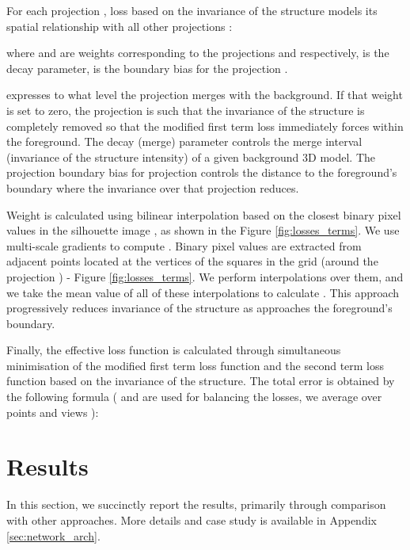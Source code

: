\documentclass[runningheads]{llncs}
\begin{document}
For each projection , loss based on the invariance of the structure models its spatial relationship with all other projections :

where  and  are weights corresponding to the projections  and  respectively,  is the decay parameter,  is the boundary bias for the projection .

 expresses to what level the projection  merges with the background. If that weight is set to zero, the projection  is such that the invariance of the structure is completely removed so that the modified first term loss  immediately forces  within the foreground. The decay (merge) parameter controls the merge interval (invariance of the structure intensity) of a given background 3D model. The projection boundary bias  for projection  controls the distance to the foreground's boundary where the invariance over that projection reduces.

Weight  is calculated using bilinear interpolation based on the closest binary pixel values in the silhouette image , as shown in the Figure \ref{fig:losses_terms}. We use multi-scale gradients \cite{SREEGADHA2016713} to compute . Binary pixel values are extracted from adjacent points located at the vertices of the squares in the grid (around the projection ) - Figure \ref{fig:losses_terms}. We perform interpolations over them, and we take the mean value of all of these interpolations to calculate . This approach progressively reduces invariance of the structure as  approaches the foreground's boundary.

Finally, the effective loss function  is calculated through simultaneous minimisation of the modified first term loss function  and the second term loss function  based on the invariance of the structure. The total error  is obtained by the following formula ( and  are used for balancing the losses, we average over points  and views ):




\section{Results}
In this section, we succinctly report the results, primarily through comparison with other approaches. More details and case study is available in Appendix \textcolor{blue}{\ref{sec:network_arch}}.
\end{document}
